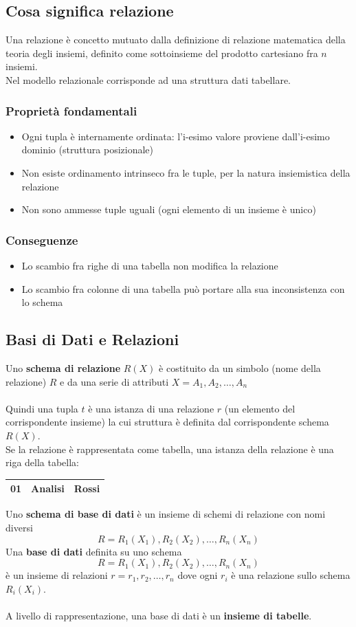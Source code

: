 \documentclass[../main.tex]{subfiles}
\begin{document}
	\subsection{Cosa significa relazione}
	Una relazione è concetto mutuato dalla definizione di relazione matematica della teoria degli insiemi, definito come sottoinsieme del prodotto cartesiano fra $n$ insiemi.\\
	Nel modello relazionale corrisponde ad una struttura dati tabellare.
	\subsubsection{Proprietà fondamentali}
	\begin{itemize}
		\item Ogni tupla è internamente ordinata: l’i-esimo valore proviene dall’i-esimo dominio (struttura posizionale)
		\item Non esiste ordinamento intrinseco fra le tuple, per la natura insiemistica della relazione
		\item Non sono ammesse tuple uguali (ogni elemento di un insieme è unico)
	\end{itemize}
	\subsubsection{Conseguenze}
	\begin{itemize}
		\item Lo scambio fra righe di una tabella non modifica la relazione
		\item Lo scambio fra colonne di una tabella può portare alla sua inconsistenza con lo schema
	\end{itemize}
	\subsection{Basi di Dati e Relazioni}
	Uno \textbf{schema di relazione} $R(X)$ è costituito da un simbolo (nome della relazione) $R$ e da una serie di attributi $X = {A_1, A_2, \ldots, A_n}$\\ \\
	Quindi una tupla $t$ è una istanza di una relazione $r$ (un elemento del corrispondente insieme) la cui struttura è definita dal corrispondente schema $R(X)$.\\
	Se la relazione è rappresentata come tabella, una istanza della relazione è una riga della tabella:
	\begin{center}
		\begin{tabular}{ |c|c|c| }
			\hline
			\textbf{01} & \textbf{Analisi} & \textbf{Rossi}\\
			\hline
		\end{tabular}
	\end{center}
	Uno \textbf{schema di base di dati} è un insieme di schemi di relazione con nomi diversi
	\[ R = { R_1(X_1), R_2(X_2), \ldots, R_n(X_n) } \]
	Una \textbf{base di dati} definita su uno schema
	\[ R = { R_1(X_1), R_2(X_2), \ldots, R_n(X_n) } \]
	è un insieme di relazioni $r = { r_1, r_2, \ldots, r_n }$ dove ogni $r_i$ è una relazione sullo schema $R_i(X_i)$.\\ \\
	A livello di rappresentazione, una base di dati è un \textbf{insieme di tabelle}.
\end{document}
